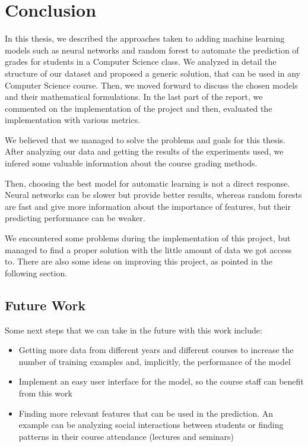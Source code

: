\chapter{Conclusion}

In this thesis, we described the approaches taken to adding machine learning
models such as neural networks and random forest to automate the prediction of
grades for students in a Computer Science class. We analyzed in detail the
structure of our dataset and proposed a generic solution, that can be used  in
any Computer Science course. Then, we moved forward to discuss the chosen
models and their mathematical formulations. In the last part of the report, 
we commented on the implementation of the project and then, evaluated the 
implementation with various metrics.

We believed that we managed to solve the problems and goals for this thesis. 
After analyzing our data and getting the results of the experiments used, 
we infered some valuable information about the course grading methods. 

Then, choosing the best model for automatic learning is not a direct 
response. Neural networks can be slower but provide better results, whereas 
random forests are fast and give more information about the importance 
of features, but their predicting performance can be weaker.

We encountered some problems during the implementation of this project, 
but managed to find a proper solution with the little amount of data we got 
access to. There are also some ideas on improving this project, as pointed in 
the following section.

\section{Future Work}

Some next steps that we can take in the future with this work include: 

\begin{itemize}
\item Getting more data from different years and different courses to increase 
the number of training examples and, implicitly, the performance of the model
\item Implement an easy user interface for the model, so the course staff can 
benefit from this work
\item Finding more relevant features that can be used in the prediction. An 
example can be analyzing social interactions between students or finding 
patterns in their course attendance (lectures and seminars)
\end{itemize}

